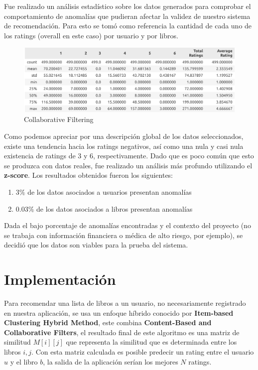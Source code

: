 \documentclass[14pt]{extarticle}
\begin{document}
Fue realizado un análisis estadístico sobre los datos generados para comprobar el comportamiento de anomalías que pudieran afectar la validez de nuestro sistema de recomendación. Para esto se tomó como referencia la cantidad de cada uno de los ratings (overall en este caso) por usuario y por libros.

\begin{figure}[H]
    \centering
    \includegraphics[width=\textwidth]{./images/general_stats.png}
    \caption{Collaborative Filtering}
    \label{Collaborative Filtering}
\end{figure}

Como podemos apreciar por una descripción global de los datos seleccionados, existe una tendencia hacia los ratings negativos, así como una nula y casi nula existencia de ratings de 3 y 6, respectivamente. Dado que es poco común que esto se produzca con datos reales, fue realizado un análisis más profundo utilizando el \textbf{z-score}. Los resultados obtenidos fueron los siguientes:

\begin{enumerate}
    \item $3\%$ de los datos asociados a usuarios presentan anomalías
    \item $0.03\%$ de los datos asociados a libros presentan anomalías
\end{enumerate}

Dada el bajo porcentaje de anomalías encontradas y el contexto del proyecto (no se trabaja con información financiera o médica de alto riesgo, por ejemplo), se decidió que los datos son viables para la prueba del sistema.

\section{Implementación}

Para recomendar una lista de libros a un usuario, no necesariamente registrado en nuestra aplicación, se usa un enfoque híbrido conocido por \textbf{Item-based Clustering Hybrid Method}, este combina \textbf{Content-Based and Collaborative Filters}, el resultado final de este algoritmo es una matriz de similitud $M[i][j]$ que representa la similitud que es determinada entre los libros $i, j$. Con esta matriz calculada es posible predecir un rating entre el usuario $u$ y el libro $b$, la salida de la aplicación serían los mejores $N$ ratings.   
\end{document}
